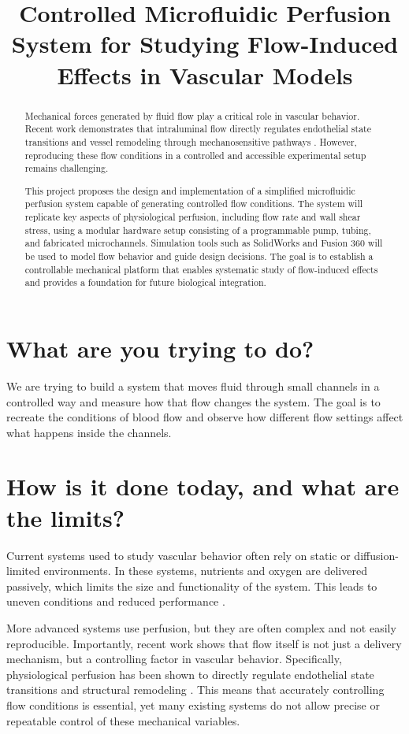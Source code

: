 \documentclass[conference]{IEEEtran}
\title{Controlled Microfluidic Perfusion System for Studying Flow-Induced Effects in Vascular Models}
\author{
\IEEEauthorblockN{Neil K.}
\IEEEauthorblockA{
University of California, Santa Cruz\\
Email: Nkarkhan@ucsc.edu
}
}
\begin{document}
\maketitle

\begin{abstract}
Mechanical forces generated by fluid flow play a critical role in vascular behavior. Recent work demonstrates that intraluminal flow directly regulates endothelial state transitions and vessel remodeling through mechanosensitive pathways \cite{yap2026}. However, reproducing these flow conditions in a controlled and accessible experimental setup remains challenging.

This project proposes the design and implementation of a simplified microfluidic perfusion system capable of generating controlled flow conditions. The system will replicate key aspects of physiological perfusion, including flow rate and wall shear stress, using a modular hardware setup consisting of a programmable pump, tubing, and fabricated microchannels. Simulation tools such as SolidWorks and Fusion 360 will be used to model flow behavior and guide design decisions. The goal is to establish a controllable mechanical platform that enables systematic study of flow-induced effects and provides a foundation for future biological integration.
\end{abstract}

\section{What are you trying to do?}

We are trying to build a system that moves fluid through small channels in a controlled way and measure how that flow changes the system. The goal is to recreate the conditions of blood flow and observe how different flow settings affect what happens inside the channels.

\section{How is it done today, and what are the limits?}

Current systems used to study vascular behavior often rely on static or diffusion-limited environments. In these systems, nutrients and oxygen are delivered passively, which limits the size and functionality of the system. This leads to uneven conditions and reduced performance \cite{pham2018}.

More advanced systems use perfusion, but they are often complex and not easily reproducible. Importantly, recent work shows that flow itself is not just a delivery mechanism, but a controlling factor in vascular behavior. Specifically, physiological perfusion has been shown to directly regulate endothelial state transitions and structural remodeling \cite{yap2026}. This means that accurately controlling flow conditions is essential, yet many existing systems do not allow precise or repeatable control of these mechanical variables.
\end{document}
